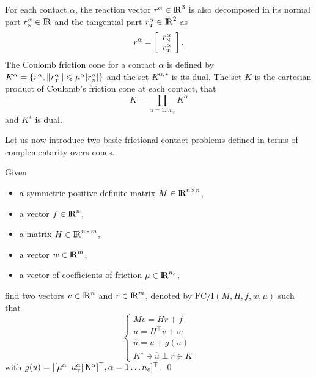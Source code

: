 
For each contact $\alpha$, the reaction vector $r^\alpha\in \mathrm{I\!R}^3$ is also decomposed in its normal part $r_{\hbox{\tiny{N}}}^{\alpha}\in \mathrm{I\!R}$ and the tangential part $r_{\hbox{\tiny{T}}}^\alpha\in\mathrm{I\!R}^2$ as
\begin{equation}
  \label{eq:contactreaction}
  r^\alpha = \left[
  \begin{array}{c}
    r^\alpha_{\n} \\
    r^\alpha_{\t}   
  \end{array}\right].
\end{equation}
The Coulomb friction cone for a  contact $\alpha$ is defined by $K^{\alpha}  = \{r^\alpha, \|r^\alpha_{\hbox{\tiny{T}}} \| \leqslant \mu^\alpha |r^\alpha_{\hbox{\tiny{N}}}| \}$ and the set $K^{\alpha,\star}$ is its dual. 
The set $K$ is the cartesian product of Coulomb's friction cone at each contact, that 
\begin{equation}
  \label{eq:CC}
  K = \prod_{\alpha=1\ldots n_c} K^{\alpha} 
\end{equation}
and $K^\star$ is dual.

Let us now introduce two basic frictional contact problems defined in terms of complementarity overs cones.
\begin{problem}\label{prob:I}
  Given
  \begin{itemize}
    \item a symmetric positive definite matrix ${M} \in \mathrm{I\!R}^{n \times n}$,
    \item a vector $ {f} \in \mathrm{I\!R}^n$,
    \item a matrix  ${H} \in \mathrm{I\!R}^{n \times m}$,
    \item a vector $w \in \mathrm{I\!R}^{m}$,
    \item a vector of coefficients of friction $\mu \in \mathrm{I\!R}^{n_c}$,
  \end{itemize}
find two vectors $ {v} \in \mathrm{I\!R}^n$ and $r\in \mathrm{I\!R}^m$, denoted by $\mathrm{FC/I}(M,H,f,w,\mu)$  such that
\begin{equation}\label{eq:soccp1}
  \begin{cases}
    M v = {H} {r} + {f} \\[2mm]
    u = H^\top v + w \\[2mm]
    \hat u = u + g(u) \\[2mm]
    K^\star \ni {\hat u} \perp r \in K
  \end{cases}
\end{equation}
with $g(u) = [[\mu^\alpha  \|u^\alpha_{\hbox{\tiny{T}}}\| {\sf N}^\alpha]^\top, \alpha = 1\ldots n_c]^\top$. 
\qed
\end{problem}

